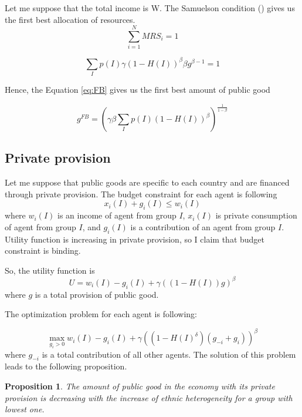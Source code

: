 \documentclass[letterpaper,11pt]{article}
\newtheorem{proposition}{Proposition}
\begin{document}
Let me suppose that the total income is W. The Samuelson condition (\cite{Samuelson}) gives us the first best allocation of resources.
\begin{equation}
    \label{eq:SC}
    \sum_{i = 1}^{N} MRS_i = 1
\end{equation}

\[ \sum_{I} p(I) \gamma(1-H(I))^\beta \beta g^{\beta - 1} = 1 \]

Hence, the Equation \ref{eq:FB} gives us the first best amount of public good

\begin{equation}
   g^{FB} = \left( \gamma\beta \sum_{I} p(I) (1-H(I))^{\beta} \right) ^\frac{1}{1 - \beta } 
   \label{eq:FB}
\end{equation}

\subsection{Private provision}

Let me suppose that public goods are specific to each country and are financed through private provision. 
The budget constraint for each agent is following
\[x_i(I) + g_i(I) \le  w_i(I) \]
where $w_i(I)$ is an income of agent from group $I$, $x_i(I)$ is private consumption of agent from group $I$,  and $g_i(I)$ is a contribution of an agent from group $I$. Utility function is increasing in private provision, so I claim that budget constraint is binding.

So, the utility function is
\[ U = w_i(I) - g_i(I) + \gamma( (1 - H(I) ) g)^\beta \] 
where $g$ is a total provision of public good.

The optimization problem for each agent is following:

\[ \max_{g_i > 0} w_i(I) - g_i(I) + \gamma( (1 - H(I)^\delta) (g_{-i} + g_i))^\beta  \]
where $g_{-i}$ is a total contribution of all other agents.
The solution of this problem leads to the following proposition.

\begin{proposition}
The amount of public good in the economy with its private provision is decreasing with the increase of ethnic heterogeneity for a group with lowest one.
\end{proposition}
\end{document}
